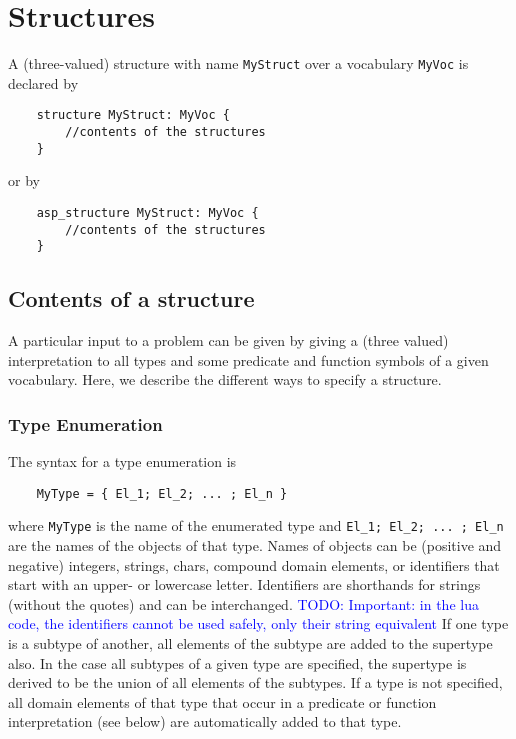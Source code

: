 \documentclass[a4]{article}
\newcommand{\code}[1]{{\tt #1}}
\newcommand{\todo}[1]{\textcolor{blue}{TODO: #1}}
\begin{document}
\section{Structures}

A (three-valued) structure with name \code{MyStruct} over a vocabulary \code{MyVoc} is declared by
\begin{lstlisting}
	structure MyStruct: MyVoc {
		//contents of the structures
	}
\end{lstlisting}
or by 
\begin{lstlisting}
	asp_structure MyStruct: MyVoc {
		//contents of the structures
	}
\end{lstlisting}

\subsection{Contents of a structure}


A particular input to a problem can be given by giving a (three valued) interpretation to all types and some predicate and function symbols of a given vocabulary. Here, we describe the different ways to specify a structure.

\subsubsection{Type Enumeration}
The syntax for a type enumeration is 
\begin{lstlisting}
	MyType = { El_1; El_2; ... ; El_n }
\end{lstlisting}
where {\tt MyType} is the name of the enumerated type and {\tt El\_1; El\_2; ... ; El\_n } are the names of the objects of that type. Names of objects can be (positive and negative) integers, strings, chars, compound domain elements, or identifiers that start with an upper- or lowercase letter. 
Identifiers are shorthands for strings (without the quotes) and can be interchanged.
\todo{Important: in the lua code, the identifiers cannot be used safely, only their string equivalent}
If one type is a subtype of another, all elements of the subtype are added to the supertype also.  In the case all subtypes of a given type are specified, the supertype is derived to be the union of all elements of the subtypes.  If a type is not specified, all domain elements of that type that occur in a predicate or function interpretation (see below) are automatically added to that type.  
\end{document}
